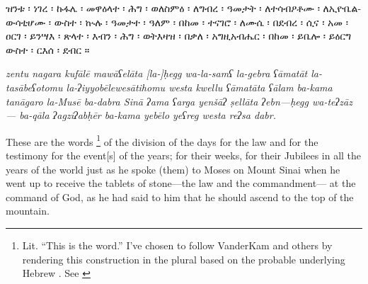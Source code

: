 \begin{translation}
    \begin{otherlanguage}{amharic}
        ዝንቱ ፡ ነገረ ፡ ኩፋሌ ፡
        መዋዕላተ ፡ ሕግ ፡ ወለስምዕ ፡
        ለግብረ ፡ ዓመታት ፡ ለተሳብዖቶሙ ፡ 
        ለኢዮቤልውሳቲሆሙ ፡ ውስተ ፡ ኲሉ ፡ ዓመታተ ፡ ዓለም ፡
        በከመ ፡ ተናገሮ ፡ ለሙሴ ፡ በደብረ ፡ ሲና ፡
        አመ ፡ ዐርገ ፡ ይንሣእ ፡ ጽላተ ፡ እብን ፡ ሕግ ፡ ወትእዛዝ ፡ 
        በቃለ ፡ አግዚአብሔር ፡ በከመ ፡ ይቤሎ ፡ ይዕርግ ውስተ ፡ ርእሰ ፡ ደብር ።
    \end{otherlanguage}
        
    \emph{%
        zentu nagara kufālē
        mawāʕelāta [la-]ḥegg wa-la-samʕ
        la-gebra ʕāmatāt la-tasābeʕotomu
        la-ʔiyyobēlewesātihomu westa kwellu ʕāmatāta ʕālam
        ba-kama tanāgaro la-Musē ba-dabra Sinā
        ʔama ʕarga yenšāʔ ṣellāta ʔebn---ḥegg wa-teʔzāz---
        ba-qāla ʔagziʔabḥēr ba-kama yebēlo yeʕreg westa reʔsa dabr.
    }
    
        These are the words%
        \footnote{Lit. ``This is the word.'' I've chosen to follow VanderKam and others by rendering this construction in the plural based on the probable underlying Hebrew . See \cite[125]{vanderkam2018}}
        of the division 
        of the days for the law and for the testimony
        for the event[s] of the years; for their weeks,
        for their Jubilees in all the years of the world
        just as he spoke (them) to Moses on Mount Sinai 
        when he went up to receive the tablets of stone---the law and the commandment---%
        at the command of God, as he had said to him 
        that he should ascend to the top of the mountain.
    
    \end{translation}